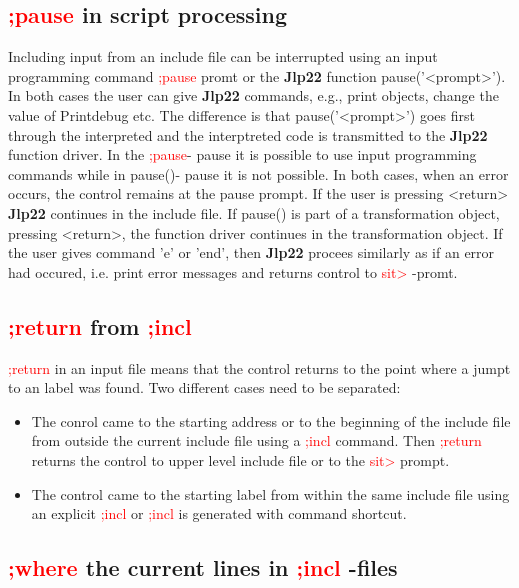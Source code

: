 \subsection{\textcolor{Red}{;pause} in script processing}
\label{inpupause}
Including input from an include file can be interrupted using an input programming
command \textcolor{Red}{;pause} promt or the \textbf{Jlp22} function \textcolor{VioletRed}{pause}('<prompt>'). In both cases
the user can give \textbf{Jlp22} commands, e.g., print objects, change the value of Printdebug etc.
The difference is that  \textcolor{VioletRed}{pause}('<prompt>') goes first through the interpreted and the interptreted
code is transmitted to the \textbf{Jlp22} function driver. In the \textcolor{Red}{;pause}- pause it is possible to
use input programming commands while in \textcolor{VioletRed}{pause}()- pause it is not possible. In both cases, when
an error occurs, the control remains at the pause prompt. If the user is pressing
<return> \textbf{Jlp22} continues in the include file. If \textcolor{VioletRed}{pause}() is part of a transformation object,
pressing <return>, the function driver continues in the transformation object.
If the user gives command 'e' or 'end', then \textbf{Jlp22} procees similarly as if an error had occured,
i.e. print error messages and returns control to \textcolor{Red}{sit>} -promt.
\subsection{\textcolor{Red}{;return} from \textcolor{Red}{;incl}}
\label{inpureturn}
\textcolor{Red}{;return} in an input file means that the control returns to the point where a
jumpt to an label was found. Two different cases need to be separated:
\begin{itemize}
\item The conrol came to the starting address or to the beginning of the include file
from outside the current include file using a \textcolor{Red}{;incl} command. Then \textcolor{Red}{;return} returns the control to upper level include
file or to the \textcolor{Red}{sit>} prompt.
\item The control came to the starting label from within the same include file using
an explicit \textcolor{Red}{;incl} or \textcolor{Red}{;incl} is generated
with command shortcut.
\end{itemize}
\subsection{\textcolor{Red}{;where} the current lines in \textcolor{Red}{;incl} -files}
\label{inpuwhere}
